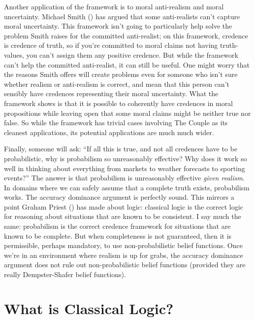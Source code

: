 \documentclass[
  11pt,
  letterpaper,
  DIV=11,
  numbers=noendperiod,
  twoside]{scrartcl}
\begin{document}
Another application of the framework is to moral anti-realism and moral
uncertainty. Michael Smith () has
argued that some anti-realists can't capture moral uncertainty. This
framework isn't going to particularly help solve the problem Smith
raises for the committed anti-realist; on this framework, credence is
credence of truth, so if you're committed to moral claims not having
truth-values, you can't assign them any positive credence. But while the
framework can't help the committed anti-realist, it can still be useful.
One might worry that the reasons Smith offers will create problems even
for someone who isn't sure whether realism or anti-realism is correct,
and mean that this person can't sensibly have credences representing
their moral uncertainty. What the framework shows is that it is possible
to coherently have credences in moral propositions while leaving open
that some moral claims might be neither true nor false. So while the
framework has trivial cases involving The Couple as its cleanest
applications, its potential applications are much much wider.

Finally, someone will ask: ``If all this is true, and not all credences
have to be probabilistic, why is probabilism so unreasonably effective?
Why does it work so well in thinking about everything from markets to
weather forecasts to sporting events?'' The answer is that probabilism
is unreasonably effective \emph{given realism}. In domains where we can
safely assume that a complete truth exists, probabilism works. The
accuracy dominance argument is perfectly sound. This mirrors a point
Graham Priest () has made about logic:
classical logic is the correct logic for reasoning about situations that
are known to be consistent. I say much the same: probabilism is the
correct credence framework for situations that are known to be complete.
But when completeness is not guaranteed, then it is permissible, perhaps
mandatory, to use non-probabilistic belief functions. Once we're in an
environment where realism is up for grabs, the accuracy dominance
argument does not rule out non-probabilistic belief functions (provided
they are really Dempster-Shafer belief functions).

\section{What is Classical Logic?}\label{sec-sec5}
\end{document}
